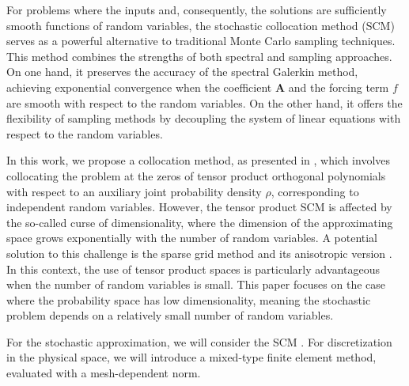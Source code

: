 \documentclass[final,onefignum,onetabnum]{mousaviart}
\begin{document}
	For problems where the inputs and, consequently, the solutions are sufficiently smooth functions of random variables, the stochastic collocation method (SCM) serves as a powerful alternative to traditional Monte Carlo sampling techniques. This method combines the strengths of both spectral and sampling approaches. On one hand, it preserves the accuracy of the spectral Galerkin method, achieving exponential convergence when the coefficient $\boldsymbol{A}$ and the forcing term $f$ are smooth with respect to the random variables. On the other hand, it offers the flexibility of sampling methods by decoupling the system of linear equations with respect to the random variables.
	
	In this work, we propose a collocation method, as presented in \cite{Babuska-Nobile-Tempone}, which involves collocating the problem at the zeros of tensor product orthogonal polynomials with respect to an auxiliary joint probability density $\hat{\rho}$, corresponding to independent random variables. However, the tensor product SCM is affected by the so-called curse of dimensionality, where the dimension of the approximating space grows exponentially with the number of random variables. A potential solution to this challenge is the sparse grid method \cite{Nobile&Tempone&Webster} and its anisotropic version \cite{Nobile&Tempone&Webster2, Beck-Nobile-Tamellini-Tempone}. In this context, the use of tensor product spaces is particularly advantageous when the number of random variables is small. This paper focuses on the case where the probability space has low dimensionality, meaning the stochastic problem depends on a relatively small number of random variables. 
	
	For the stochastic approximation, we will consider the SCM \cite{Babuska-Nobile-Tempone}. For discretization in the physical space, we will introduce a mixed-type finite element method, evaluated with a mesh-dependent norm.
	
\end{document}
